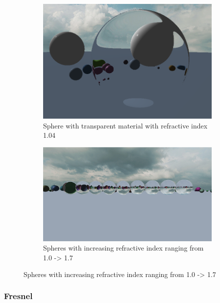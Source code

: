 \documentclass[final]{cmpreport}
\begin{document}
\begin{figure}
    \centering
    \begin{subfigure}{0.5\textwidth}
        \centering
        \includegraphics[width=0.9\linewidth]{img/refraction_hollow.png}
        \caption{Sphere with transparent material with refractive index 1.04}
        \label{sphere_refract_hollow}
    \end{subfigure}%
    \begin{subfigure}{0.5\textwidth}
        \centering
        \includegraphics[width=0.9\linewidth]{img/refractive_index.png}
        \caption{Spheres with increasing refractive index ranging from 1.0 -> 1.7}
        \label{spheres_refractive_index}
    \end{subfigure}
\end{figure}

\subsubsection{Fresnel}
\end{document}
